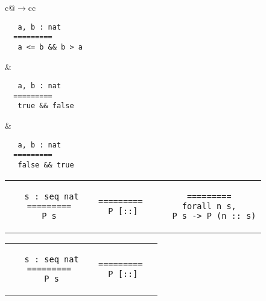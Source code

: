 \begin{landscape}
\begin{small}
\begin{multicols*}{3}[\begin{center}\section*{}\end{center}]
\begin{tabular}{c@{$\to$}cc}
\begin{minipage}{0.10\textwidth}
\begin{lstlisting}
   a, b : nat
  =========
   a <= b && b > a
  \end{lstlisting}\end{minipage}
  &
  \begin{minipage}{0.10\textwidth}\begin{lstlisting}
   a, b : nat
  =========
   true && false
  \end{lstlisting}\end{minipage}
  &
  \begin{minipage}{0.10\textwidth}\begin{lstlisting}
   a, b : nat
  =========
   false && true
  \end{lstlisting}\end{minipage}
  \end{tabular}

  \begin{tabular}{c@{$\to$}cc} 
  \begin{minipage}{0.10\textwidth}\begin{lstlisting}
   s : seq nat
  =========
   P s 
  \end{lstlisting}\end{minipage}
  &
  \begin{minipage}{0.08\textwidth}\begin{lstlisting}
  =========
   P [::]
  \end{lstlisting}\end{minipage}
  &
  \begin{minipage}{0.15\textwidth}\begin{lstlisting}
  =========
   forall n s, 
    P s -> P (n :: s)
  \end{lstlisting}\end{minipage}
  \end{tabular}
  \begin{tabular}{c@{$\to$}cc} 
  \begin{minipage}{0.10\textwidth}\begin{lstlisting}
   s : seq nat
  =========
   P s
  \end{lstlisting}\end{minipage}
  &
  \begin{minipage}{0.08\textwidth}\begin{lstlisting}
  =========
   P [::]
  \end{lstlisting}\end{minipage}
  &

\end{tabular}
\end{multicols*}
\end{small}
\end{landscape}
